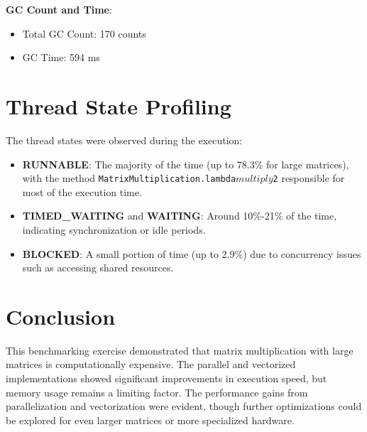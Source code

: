 \documentclass{article}
\begin{document}
\textbf{GC Count and Time}:
\begin{itemize}
    \item Total GC Count: 170 counts
    \item GC Time: 594 ms
\end{itemize}

\section{Thread State Profiling}
The thread states were observed during the execution:
\begin{itemize}
    \item \textbf{RUNNABLE}: The majority of the time (up to 78.3\% for large matrices), with the method \texttt{MatrixMultiplication.lambda$multiply$2} responsible for most of the execution time.
    \item \textbf{TIMED\_WAITING} and \textbf{WAITING}: Around 10\%-21\% of the time, indicating synchronization or idle periods.
    \item \textbf{BLOCKED}: A small portion of time (up to 2.9\%) due to concurrency issues such as accessing shared resources.
\end{itemize}

\section{Conclusion}

This benchmarking exercise demonstrated that matrix multiplication with large matrices is computationally expensive. The parallel and vectorized implementations showed significant improvements in execution speed, but memory usage remains a limiting factor. The performance gains from parallelization and vectorization were evident, though further optimizations could be explored for even larger matrices or more specialized hardware.
\end{document}
